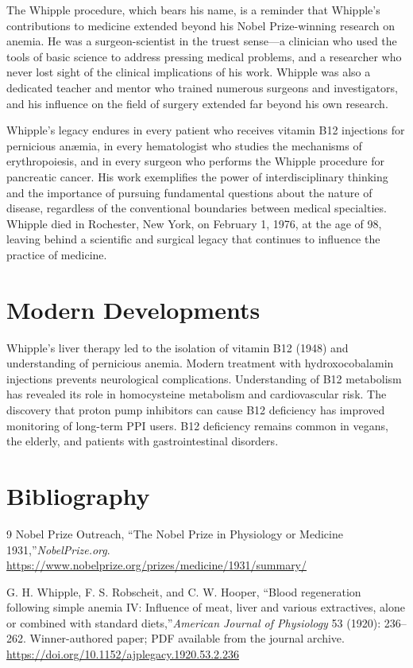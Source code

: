 The Whipple procedure, which bears his name, is a reminder that Whipple's contributions to medicine extended beyond his Nobel Prize-winning research on anemia. He was a surgeon-scientist in the truest sense---a clinician who used the tools of basic science to address pressing medical problems, and a researcher who never lost sight of the clinical implications of his work. Whipple was also a dedicated teacher and mentor who trained numerous surgeons and investigators, and his influence on the field of surgery extended far beyond his own research.

Whipple's legacy endures in every patient who receives vitamin B12 injections for pernicious an{\ae}mia, in every hematologist who studies the mechanisms of erythropoiesis, and in every surgeon who performs the Whipple procedure for pancreatic cancer. His work exemplifies the power of interdisciplinary thinking and the importance of pursuing fundamental questions about the nature of disease, regardless of the conventional boundaries between medical specialties. Whipple died in Rochester, New York, on February 1, 1976, at the age of 98, leaving behind a scientific and surgical legacy that continues to influence the practice of medicine.


\section{Modern Developments}

Whipple's liver therapy led to the isolation of vitamin B12 (1948) and understanding of pernicious anemia. Modern treatment with hydroxocobalamin injections prevents neurological complications. Understanding of B12 metabolism has revealed its role in homocysteine metabolism and cardiovascular risk. The discovery that proton pump inhibitors can cause B12 deficiency has improved monitoring of long-term PPI users. B12 deficiency remains common in vegans, the elderly, and patients with gastrointestinal disorders.


\section{Bibliography}

\begin{thebibliography}{9}
Nobel Prize Outreach, ``The Nobel Prize in Physiology or Medicine 1931,''\emph{NobelPrize.org}.\\
\url{https://www.nobelprize.org/prizes/medicine/1931/summary/}

G. H. Whipple, F. S. Robscheit, and C. W. Hooper, ``Blood regeneration following simple anemia IV: Influence of meat, liver and various extractives, alone or combined with standard diets,''\emph{American Journal of Physiology} 53 (1920): 236--262. Winner-authored paper; PDF available from the journal archive.\\
\url{https://doi.org/10.1152/ajplegacy.1920.53.2.236}
\end{thebibliography}
